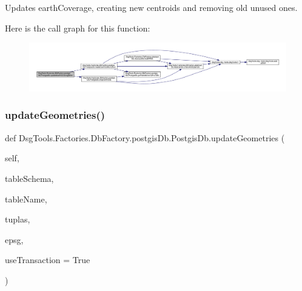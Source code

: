 \begin{DoxyVerb}Updates earthCoverage, creating new centroids and removing old unused ones.
\end{DoxyVerb}
 Here is the call graph for this function\+:
\nopagebreak
\begin{figure}[H]
\begin{center}
\leavevmode
\includegraphics[width=350pt]{class_dsg_tools_1_1_factories_1_1_db_factory_1_1postgis_db_1_1_postgis_db_ae61407d11e5b719bda0b1fbc8fc3a126_cgraph}
\end{center}
\end{figure}
\mbox{\label{class_dsg_tools_1_1_factories_1_1_db_factory_1_1postgis_db_1_1_postgis_db_a215b17e70db71b8e917a73276896f9ab}} 
\subsubsection{\texorpdfstring{update\+Geometries()}{updateGeometries()}}
{\footnotesize\ttfamily def Dsg\+Tools.\+Factories.\+Db\+Factory.\+postgis\+Db.\+Postgis\+Db.\+update\+Geometries (\begin{DoxyParamCaption}\item[{}]{self,  }\item[{}]{table\+Schema,  }\item[{}]{table\+Name,  }\item[{}]{tuplas,  }\item[{}]{epsg,  }\item[{}]{use\+Transaction = {\ttfamily True} }\end{DoxyParamCaption})}

